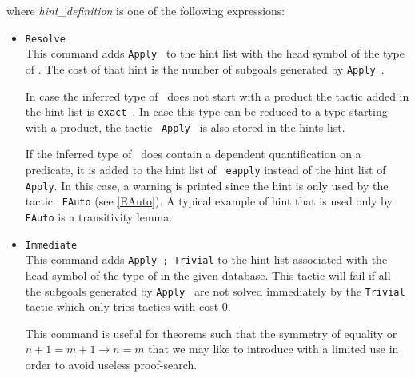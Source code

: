 \noindent where {\sl hint\_definition} is one of the following expressions:

\begin{itemize}
\item \texttt{Resolve} {\term} \\
  This command adds {\tt Apply {\term}} to the hint list
  with the head symbol of the type of \term. The cost of that hint is
  the number of subgoals generated by {\tt Apply {\term}}.
  
  In case the inferred type of \term\ does not start with a product the
  tactic added in the hint list is {\tt exact {\term}}. In case this
  type can be reduced to a type starting with a product, the tactic {\tt
    Apply {\term}} is also stored in the hints list.
  
  If the inferred type of \term\ does contain a dependent
  quantification on a predicate, it is added to the hint list of {\tt
    eapply} instead of the hint list of {\tt Apply}. In this case, a
  warning is printed since the hint is only used by the tactic {\tt
    EAuto} (see \ref{EAuto}). A typical example of hint that is used
  only by \texttt{EAuto} is a transitivity lemma.


\item \texttt{Immediate {\term}} \\
  
  This command adds {\tt Apply {\term}; Trivial} to the hint list
  associated with the head symbol of the type of \ident in the given
  database. This tactic will fail if all the subgoals generated by
  {\tt Apply {\term}} are 
  not solved immediately by the {\tt Trivial} tactic which only tries
  tactics with cost $0$.
  
  This command is useful for theorems such that the symmetry of equality
  or $n+1=m+1 \to n=m$ that we may like to introduce with a
  limited use in order to avoid useless proof-search.
  

\end{itemize}
